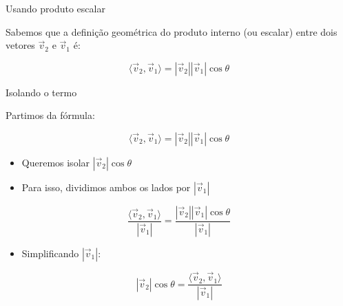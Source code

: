 \documentclass{beamer}
\begin{document}
\begin{frame}{Usando produto escalar}

Sabemos que a definição geométrica do produto interno (ou escalar) entre dois vetores $\vec{v}_2$ e $\vec{v}_1$ é:

\[
 \langle \vec{v}_2 , \vec{v}_1 \rangle = |\vec{v}_2||\vec{v}_1|\cos\theta
\]
\end{frame}
\begin{frame}{Isolando o termo}


\vspace{0.5cm}

Partimos da fórmula:

\[
\langle \vec{v}_2 , \vec{v}_1 \rangle = |\vec{v}_2||\vec{v}_1|\cos\theta
\]

\vspace{0.5cm}

\begin{itemize}
    \item Queremos isolar $|\vec{v}_2|\cos\theta$
    \item Para isso, dividimos ambos os lados por $|\vec{v}_1|$
\end{itemize}

\vspace{0.5cm}

\[
\frac{\langle \vec{v}_2 , \vec{v}_1 \rangle}{|\vec{v}_1|}
=
\frac{|\vec{v}_2||\vec{v}_1|\cos\theta}{|\vec{v}_1|}
\]


\begin{itemize}
    \item Simplificando $|\vec{v}_1|$:
\end{itemize}


\[
|\vec{v}_2|\cos\theta =
\frac{\langle \vec{v}_2 , \vec{v}_1 \rangle}{|\vec{v}_1|}
\]

\end{frame}
\end{document}
